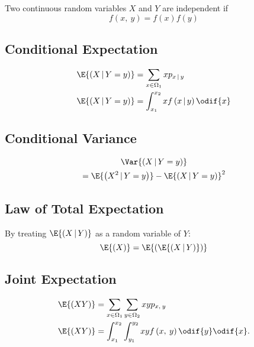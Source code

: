 \documentclass{article}
\begin{document}
\begin{multicols}{3}
    Two continuous random variables \(X\) and \(Y\) are independent if
    \begin{equation*}
        f\left( x,\: y \right) = f\left( x \right) f\left( y \right)
    \end{equation*}
    \subsection{Conditional Expectation}
    \begin{align*}
        \E{\left( X \,\vert\, Y = y \right)} & = \sum_{x\in\Omega_1} x p_{x\,\vert\,y}                     \\
        \E{\left( X \,\vert\, Y = y \right)} & = \int_{x_1}^{x_2} x f\left( x \,\vert\, y \right) \odif{x}
    \end{align*}
    \subsection{Conditional Variance}
    \begin{multline*}
        \Var{\left( X \,\vert\, Y = y \right)} \\
        = \E{\left( X^2 \,\vert\, Y = y \right)} - \E{\left( X \,\vert\, Y = y \right)}^2
    \end{multline*}
    \subsection{Law of Total Expectation}
    By treating \(\E{\left( X \,\vert\, Y \right)}\) as a random variable of \(Y\):
    \begin{equation*}
        \E{\left( X \right)} = \E{\left( \E{\left( X \,\vert\, Y \right)} \right)}
    \end{equation*}
    \subsection{Joint Expectation}
    \begin{align*}
        \E{\left( XY \right)} & = \sum_{x\in\Omega_1} \sum_{y\in\Omega_2} xy p_{x,\: y}                          \\
        \E{\left( XY \right)} & = \int_{x_1}^{x_2} \int_{y_1}^{y_2} xy f\left( x,\: y \right) \odif{y} \odif{x}.
    \end{align*}

\end{multicols}
\end{document}
